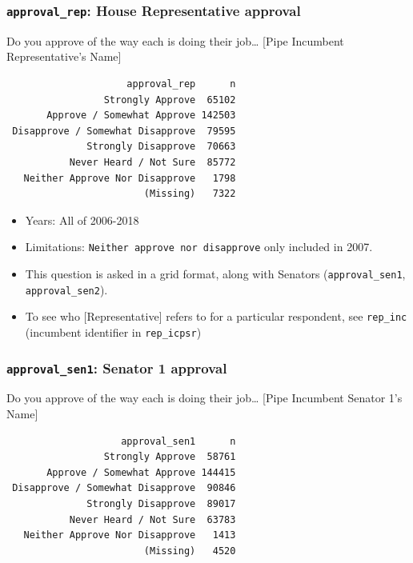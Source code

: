 \documentclass[10pt,article,oneside]{memoir}
\theoremstyle{definition}
\begin{document}
\subsubsection{\texorpdfstring{\texttt{approval\_rep}: House
Representative
approval}{approval\_rep: House Representative approval}}\label{approval_rep-house-representative-approval}

Do you approve of the way each is doing their job\ldots{} {[}Pipe
Incumbent Representative's Name{]}

\begin{verbatim}
                     approval_rep      n
                 Strongly Approve  65102
       Approve / Somewhat Approve 142503
 Disapprove / Somewhat Disapprove  79595
              Strongly Disapprove  70663
           Never Heard / Not Sure  85772
   Neither Approve Nor Disapprove   1798
                        (Missing)   7322
\end{verbatim}

\begin{itemize}
\tightlist
\item
  Years: All of 2006-2018
\item
  Limitations: \texttt{Neither\ approve\ nor\ disapprove} only included
  in 2007.
\item
  This question is asked in a grid format, along with Senators
  (\texttt{approval\_sen1}, \texttt{approval\_sen2}).
\item
  To see who {[}Representative{]} refers to for a particular respondent,
  see \texttt{rep\_inc} (incumbent identifier in \texttt{rep\_icpsr})
\end{itemize}

\subsubsection{\texorpdfstring{\texttt{approval\_sen1}: Senator 1
approval}{approval\_sen1: Senator 1 approval}}\label{approval_sen1-senator-1-approval}

Do you approve of the way each is doing their job\ldots{} {[}Pipe
Incumbent Senator 1's Name{]}

\begin{verbatim}
                    approval_sen1      n
                 Strongly Approve  58761
       Approve / Somewhat Approve 144415
 Disapprove / Somewhat Disapprove  90846
              Strongly Disapprove  89017
           Never Heard / Not Sure  63783
   Neither Approve Nor Disapprove   1413
                        (Missing)   4520
\end{verbatim}
\end{document}
